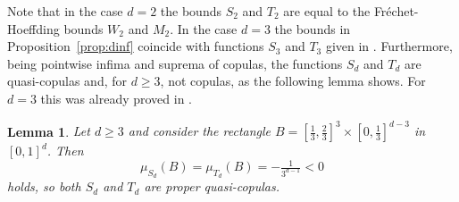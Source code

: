 \documentclass[12pt,a4paper]{amsart}
\newtheorem{lemma}[theorem]{Lemma}
\theoremstyle{definition}
\begin{document}
Note that in the case $d=2$ the bounds $S_2$ and $T_2 $ are equal to the Fr\'{e}chet-Hoeffding bounds $W_2$ and $M_2$. In the case $d=3$ the bounds in Proposition~\ref{prop:dinf} coincide with functions $S_3$ and $T_3$ given in \cite{NeUb12}. Furthermore, being pointwise infima and suprema of copulas, the functions $S_d$ and $T_d$ are quasi-copulas and, for $d \ge 3$, not copulas, as the following lemma shows. For $d=3$ this was already proved in \cite{NeUb12}.

\begin{lemma}
Let $d \geq 3$ and consider the rectangle $B = [\frac13, \frac23]^3 \times [0, \frac13]^{d-3}$ in $[0, 1]^d$. Then 
$$ \mu_{S_d}(B) = \mu_{T_d}(B) = - \tfrac{1}{3^{d-1}} < 0$$
holds, so both $S_d$ and $T_d$ are proper quasi-copulas.
\end{lemma}
\end{document}
